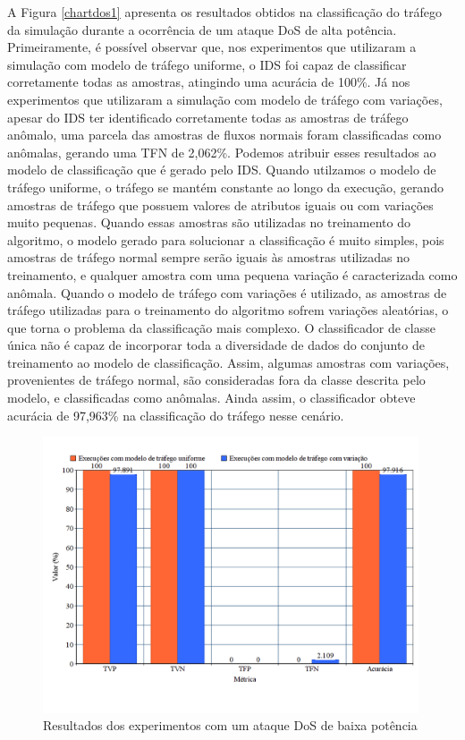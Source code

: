 \documentclass[cic,tc]{iiufrgs}
\begin{document}
A Figura \ref{chartdos1} apresenta os resultados obtidos na classificação do tráfego da simulação durante a ocorrência de um ataque DoS de alta potência. Primeiramente, é possível observar que, nos experimentos que utilizaram a simulação com modelo de tráfego uniforme, o IDS foi capaz de classificar corretamente todas as amostras, atingindo uma acurácia de 100\%. Já nos experimentos que utilizaram a simulação com modelo de tráfego com variações, apesar do IDS ter identificado corretamente todas as amostras de tráfego anômalo, uma parcela das amostras de fluxos normais foram classificadas como anômalas, gerando uma TFN de 2,062\%. Podemos atribuir esses resultados ao modelo de classificação que é gerado pelo IDS. Quando utilzamos o modelo de tráfego uniforme, o tráfego se mantém constante ao longo da execução, gerando amostras de tráfego que possuem valores de atributos iguais ou com variações muito pequenas. Quando essas amostras são utilizadas no treinamento do algoritmo, o modelo gerado para solucionar a classificação é muito simples, pois amostras de tráfego normal sempre serão iguais às amostras utilizadas no treinamento, e qualquer amostra com uma pequena variação é caracterizada como anômala. Quando o modelo de tráfego com variações é utilizado, as amostras de tráfego utilizadas para o treinamento do algoritmo sofrem variações aleatórias, o que torna o problema da classificação mais complexo. O classificador de classe única não é capaz de incorporar toda a diversidade de dados do conjunto de treinamento ao modelo de classificação. Assim, algumas amostras com variações, provenientes de tráfego normal, são consideradas fora da classe descrita pelo modelo, e classificadas como anômalas. Ainda assim, o classificador obteve acurácia de 97,963\% na classificação do tráfego nesse cenário.

\begin{figure}[h]
   \caption{Resultados dos experimentos com um ataque DoS de baixa potência}
   \begin{center}
       \includegraphics[width=30em]{chartdos2}
   \end{center}
   \label{chartdos2}
\end{figure}
\end{document}
